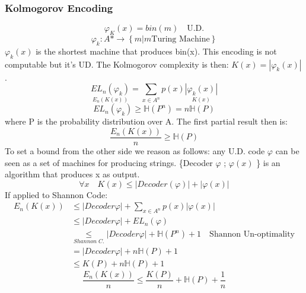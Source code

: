     \subsubsection*{Kolmogorov Encoding}
    $$\varphi_K(x) = bin(m)\quad\text{U.D.}$$
    $$\varphi_k: A* \longrightarrow \left\{ m | m \text{Turing Machine} \right\}$$
    $\varphi_k(x)$ is the shortest machine that produces bin(x). This encoding is not computable but it's UD.
    The Kolmogorov complexity is then: $K(x) = |\varphi_k(x)|$.
    $$\underset{E_n(K(x))}{EL_n(\varphi_k)} = \sum_{x\in A^n}{p(x)\underset{K(x)}{|\varphi_k(x)|}}$$
    $$EL_n(\varphi_k) \geq \mathbb{H}(P^n) = n\mathbb{H}(P)$$
    where P is the probability distribution over A. The first partial result then is: 
    $$\frac{E_n(K(x))}{n} \geq \mathbb{H}(P)$$
    To set a bound from the other side we reason as follows: any U.D. code $\varphi$ can be seen as a set of machines for producing strings. \{Decoder $\varphi$ ; $\varphi(x)$ \} is an algorithm that produces x as output.
    $$\forall x\quad K(x) \leq |Decoder(\varphi)|+|\varphi(x)|$$
    If applied to Shannon Code:
    \begin{align*}
        E_n(K(x)) &\leq |Decoder \varphi|+ \sum_{x\in A^n}{p(x)|\varphi(x)|}\\
        & \leq |Decoder \varphi| + EL_n(\varphi)\\
        & \underset{Shannon\;C.}{\leq} |Decoder \varphi| + \mathbb{H}(P^n)+1 \quad \text{Shannon Un-optimality}\\
        & =|Decoder \varphi| + n\mathbb{H}(P)+1\\
        & \leq K(P) + n\mathbb{H}(P)+1
    \end{align*}
    $$\frac{E_n(K(x))}{n} \leq \frac{K(P)}{n}+ \mathbb{H}(P)+\frac{1}{n}$$
    
    

